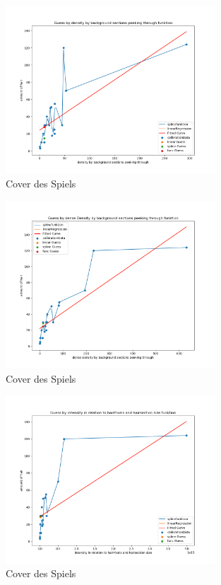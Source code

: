 \documentclass[german,a4paper, 12pt]{scrartcl}
\begin{document}
\begin{figure}
	\centering
	\includegraphics[width=0.7\textwidth]{figBina/g6.png}
	\caption[]{Cover des Spiels}
	\label{img:Bina01}
\end{figure}
\begin{figure}
	\centering
	\includegraphics[width=0.7\textwidth]{figBina/g7.png}
	\caption[]{Cover des Spiels}
	\label{img:Bina01}
\end{figure}
\begin{figure}
	\centering
	\includegraphics[width=0.7\textwidth]{figBina/g8.png}
	\caption[]{Cover des Spiels}
	\label{img:Bina01}
\end{figure}
\end{document}
